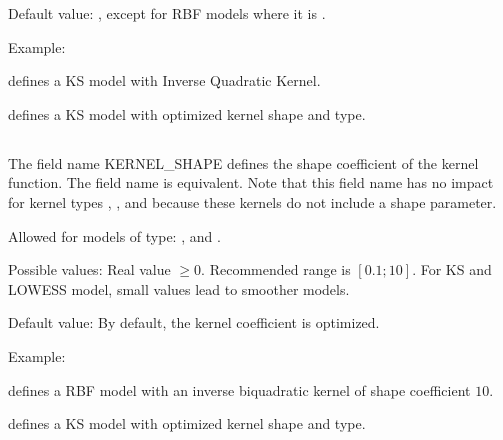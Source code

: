 \documentclass[letterpaper,10pt,english]{sphinxmanual}
\begin{document}
\begin{DUlineblock}{0em}
\item[] Default value: , except for RBF models where it is .
\end{DUlineblock}

\begin{DUlineblock}{0em}
\item[] Example:
\item[]  defines a KS model with Inverse Quadratic Kernel.
\item[]  defines a KS model with optimized kernel shape and type.
\end{DUlineblock}


\subsection{}
\label{\detokenize{SgteLib:kernel-shape}}\label{\detokenize{SgteLib:id16}}
\begin{DUlineblock}{0em}
\item[] The field name KERNEL\_SHAPE defines the shape coefficient of the kernel function. The field name  is equivalent. Note that this field name has no impact for kernel types , ,  and  because these kernels do not include a shape parameter.
\item[] Allowed for models of type: {\hyperref[\detokenize{SgteLib:rbf}]{}}, {\hyperref[\detokenize{SgteLib:ks}]{}} and {\hyperref[\detokenize{SgteLib:lowess}]{}}.
\item[] Possible values: Real value \(\geq 0\). Recommended range is \([0.1; 10]\). For KS and LOWESS model, small values lead to smoother models.
\item[] Default value: By default, the kernel coefficient is optimized.
\end{DUlineblock}

\begin{DUlineblock}{0em}
\item[] Example:
\item[]  defines a RBF model with an inverse bi\sphinxhyphen{}quadratic kernel of shape coefficient \(10\).
\item[]  defines a KS model with optimized kernel shape and type.
\end{DUlineblock}
\end{document}
